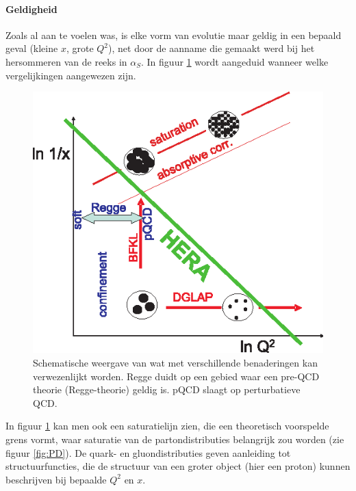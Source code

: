 \documentclass[a4paper,11pt]{article}
\numberwithin{equation}{section} %
\begin{document}
      \paragraph{Geldigheid}
Zoals al aan te voelen was, is elke vorm van evolutie maar geldig in een bepaald geval (kleine $x$, grote $Q^2$), net door de aanname die gemaakt werd bij het hersommeren van de reeks in $\alpha_S$.
In figuur \ref{fig:DGLAP-BFKL} wordt aangeduid wanneer welke vergelijkingen aangewezen zijn.
\begin{figure} [H]
  \begin{center}
    \includegraphics[scale=1]{Afbeeldingen/DGLAP-BFKL.eps}
    \caption{Schematische weergave van wat met verschillende benaderingen kan verwezenlijkt worden. Regge duidt op een gebied waar een pre-QCD theorie (Regge-theorie) geldig is. pQCD slaagt op perturbatieve QCD. \cite{Martin}}
   \label{fig:DGLAP-BFKL}
  \end{center}
\end{figure}
In figuur \ref{fig:DGLAP-BFKL} kan men ook een saturatielijn zien, die een theoretisch voorspelde grens vormt, waar saturatie van de partondistributies belangrijk zou worden (zie figuur \ref{fig:PD}).
De quark- en gluondistributies geven aanleiding tot structuurfuncties, die de structuur van een groter object (hier een proton) kunnen beschrijven bij bepaalde $Q^2$ en $x$.
\end{document}

